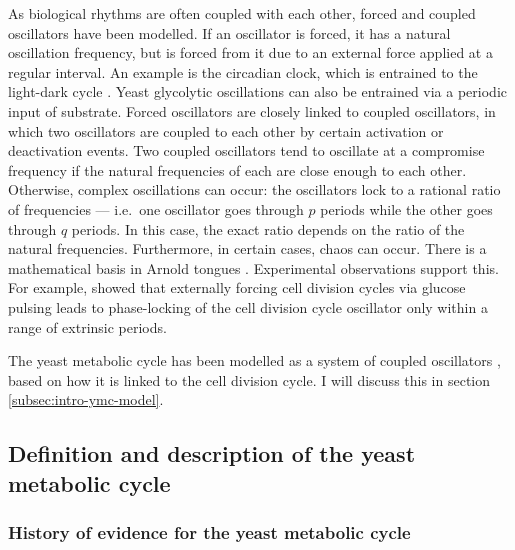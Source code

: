 As biological rhythms are often coupled with each other, forced and coupled oscillators have been modelled.
If an oscillator is forced, it has a natural oscillation frequency, but is forced from it due to an external force applied at a regular interval.
An example is the circadian clock, which is entrained to the light-dark cycle \parencite{goldbeterMultisynchronizationOtherPatterns}.
Yeast glycolytic oscillations can also be entrained via a periodic input of substrate.
Forced oscillators are closely linked to coupled oscillators, in which two oscillators are coupled to each other by certain activation or deactivation events.
Two coupled oscillators tend to oscillate at a compromise frequency if the natural frequencies of each are close enough to each other.
Otherwise, complex oscillations can occur: the oscillators lock to a rational ratio of frequencies --- i.e.\ one oscillator goes through $p$ periods while the other goes through $q$ periods.
In this case, the exact ratio depends on the ratio of the natural frequencies.
Furthermore, in certain cases, chaos can occur.
There is a mathematical basis in Arnold tongues \citep{heltbergTaleTwoRhythms2021}.
Experimental observations support this.
For example, \citet{charvinForcedPeriodicExpression2009} showed that externally forcing cell division cycles via glucose pulsing leads to phase-locking of the cell division cycle oscillator only within a range of extrinsic periods.

The yeast metabolic cycle has been modelled as a system of coupled oscillators \citep{papagiannakisAutonomousMetabolicOscillations2017,ozsezenInferenceHighLevelInteraction2019}, based on how it is linked to the cell division cycle.
I will discuss this in section \ref{subsec:intro-ymc-model}.

\subsection{Definition and description of the yeast metabolic cycle}
\label{subsec:intro-ymc-definition}

\subsubsection{History of evidence for the yeast metabolic cycle}
\label{subsubsec:intro-ymc-definition-history}

